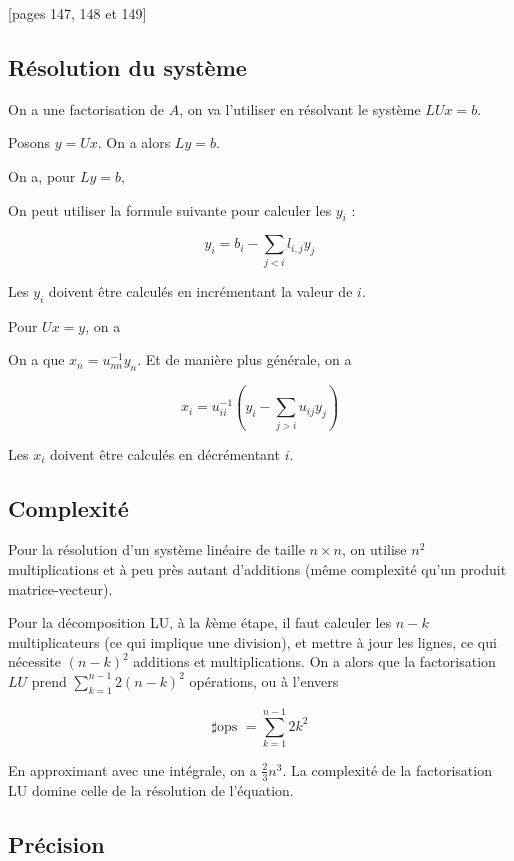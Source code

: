	[pages 147, 148 et 149]
	
	\subsection{Résolution du système}
	
	On a une factorisation de $A$, on va l'utiliser en résolvant le système $LUx = b$.
	
	Posons $y = Ux$. On a alors $Ly = b$.
	
	On a, pour $Ly = b$,
	
	
	On peut utiliser la formule suivante pour calculer les $y_i$ :
	
	$$y_i = b_i - \sum_{j < i}l_{i, j} y_j$$
	
	Les $y_i$ doivent être calculés en incrémentant la valeur de $i$.
	
	Pour $Ux = y$, on a
	
	
	On a que $x_n = u^{-1}_{nn}y_n$. Et de manière plus générale, on a
	
	$$x_i = u^{-1}_{ii}(y_i - \sum_{j > i} u_{ij}y_j)$$
	
	Les $x_i$ doivent être calculés en décrémentant $i$.
	
	
	\subsection{Complexité}
	
	Pour la résolution d'un système linéaire de taille $n \times n$, on utilise $n^2$ multiplications et à peu près autant d'additions (même complexité qu'un produit matrice-vecteur).
	
	Pour la décomposition LU, à la $k$ème étape, il faut calculer les $n - k$ multiplicateurs (ce qui implique une division), et mettre à jour les lignes, ce qui nécessite $(n - k)^2$ additions et multiplications. On a alors que la factorisation $LU$ prend $\sum_{k = 1}^{n - 1}2(n-k)^2$ opérations, ou à l'envers
	
	$$\sharp\text{ops } = \sum_{k = 1}^{n - 1} 2k^2$$
	
	En approximant avec une intégrale, on a $\frac{2}{3}n^3$. La complexité de la factorisation LU domine celle de la résolution de l'équation.
	
	\subsection{Précision}
	
